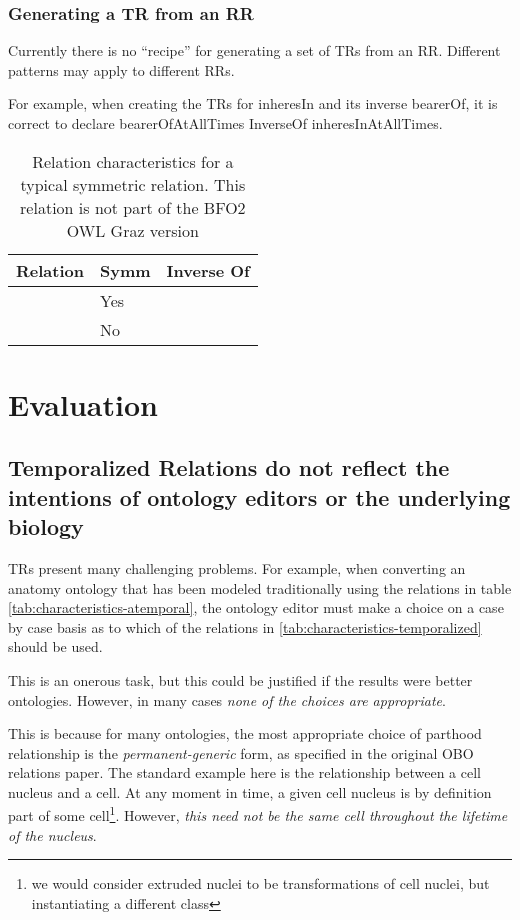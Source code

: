 \documentclass{bioinfo}
\def\adjacentTo{\pr{adjacent\_to}}
\def\atAllTimes{\pr{at-all-times}}
\def\atSomeTimes{\pr{at-some-times}}
\begin{document}
\subsubsection{Generating a TR from an RR}

Currently there is no ``recipe'' for generating a set of TRs from an
RR. Different patterns may apply to different RRs.

For example, when creating the TRs for inheresIn and its inverse
bearerOf, it is correct to declare bearerOfAtAllTimes InverseOf
inheresInAtAllTimes.




\begin{table}
\begin{tabular}{ | p{3cm} | p{1cm} | p{4cm} | }
\hline
\textbf{Relation} & \textbf{Symm} & \textbf{Inverse Of}  \\
\hline
\adjacentTo\ \atSomeTimes & Yes & \adjacentTo\ \atSomeTimes \\
\hline
\adjacentTo\ \atAllTimes & No & \\
\hline
\end{tabular}
\caption{Relation characteristics for a typical symmetric relation. This relation is not part of the BFO2 OWL Graz version}
\label{tab:characteristics-adj}
\end{table}


\section{Evaluation}

\subsection{Temporalized Relations do not reflect the intentions of
  ontology editors or the underlying biology}

TRs present many challenging problems. For example, when converting an
anatomy ontology that has been modeled traditionally using the
relations in table \ref{tab:characteristics-atemporal}, the ontology
editor must make a choice on a case by case basis as to which of
the relations in \ref{tab:characteristics-temporalized} should be
used.

This is an onerous task, but this could be justified if the results
were better ontologies. However, in many cases \emph{none of the
  choices are appropriate}.

This is because for many ontologies, the most appropriate choice of
parthood relationship is the \emph{permanent-generic} form, as
specified in the original OBO relations paper. The standard example
here is the relationship between a cell nucleus and a cell. At any
moment in time, a given cell nucleus is by definition part of some
cell\footnote{we would consider extruded nuclei to be transformations
  of cell nuclei, but instantiating a different class}. However,
\emph{this need not be the same cell throughout the lifetime of the
  nucleus}.
\end{document}
